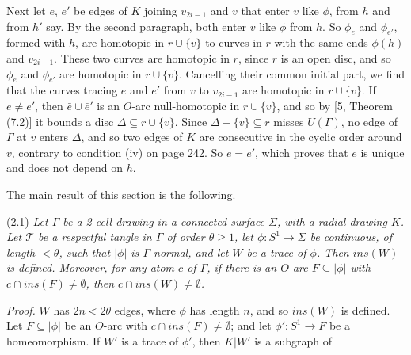 {Next let $e$, $e'$ be edges of $K$ joining $v_{2i-1}$ and $v$ that enter $v$ like $\phi$, from $h$ and from $h'$ say. By the second paragraph, both enter $v$ like $\phi$ from $h$. So $\phi_e$ and $\phi_{e'}$, formed with $h$, are homotopic in $r \cup \{v\}$ to curves in $r$ with the same ends $\phi(h)$ and $v_{2i-1}$. These two curves are homotopic in $r$, since $r$ is an open disc, and so $\phi_e$ and $\phi_{e'}$ are homotopic in $r \cup \{v\}$. Cancelling their common initial part, we find that the curves tracing $e$ and $e'$ from $v$ to $v_{2i-1}$ are homotopic in $r \cup \{v\}$. If $e \ne e'$, then $\bar{e} \cup \bar{e}'$ is an $O$-arc null-homotopic in $r \cup \{v\}$, and so by [5, Theorem (7.2)] it bounds a disc $\Delta \subseteq r \cup \{v\}$. Since $\Delta - \{v\} \subseteq r$ misses $U(\Gamma)$, no edge of $\Gamma$ at $v$ enters $\Delta$, and so two edges of $K$ are consecutive in the cyclic order around $v$, contrary to condition (iv) on page 242. So $e = e'$, which proves that $e$ is unique and does not depend on $h$.}

The main result of this section is the following.

\stmt
(2.1) \textit{Let $\Gamma$ be a 2-cell drawing in a connected surface $\Sigma$, with a radial drawing $K$. Let $\mathscr{T}$ be a respectful tangle in $\Gamma$ of order $\theta \ge 1$, let $\phi \colon S^1 \to \Sigma$ be continuous, of length $<\theta$, such that $|\phi|$ is $\Gamma$-normal, and let $W$ be a trace of $\phi$. Then $ins(W)$ is defined. Moreover, for any atom $c$ of $\Gamma$, if there is an $O$-arc $F \subseteq |\phi|$ with $c \cap ins(F) \ne \emptyset$, then $c \cap ins(W) \ne \emptyset$.}

\textit{Proof.} $W$ has $2n < 2\theta$ edges, where $\phi$ has length $n$, and so $ins(W)$ is defined. Let $F \subseteq |\phi|$ be an $O$-arc with $c \cap ins(F) \ne \emptyset$; and let $\phi' \colon S^1 \to F$ be a homeomorphism. If $W'$ is a trace of $\phi'$, then $K | W'$ is a subgraph of
